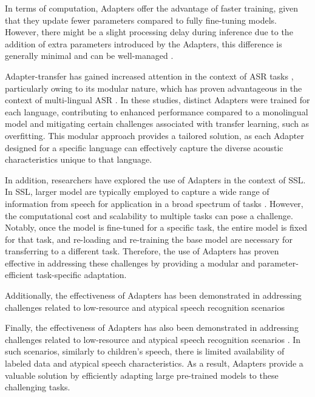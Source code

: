 In terms of computation, Adapters offer the advantage of faster training, given that they update fewer parameters compared to fully fine-tuning models. However, there might be a slight processing delay during inference due to the addition of extra parameters introduced by the Adapters, this difference is generally minimal and can be well-managed \cite{ruckle2020adapterdrop}.

Adapter-transfer has gained increased attention in the context of ASR tasks \cite{cappellazzo2023parameter,chen2023efficient,10095837}, particularly owing to its modular nature, which has proven advantageous in the context of multi-lingual ASR \cite{kannan2019large, hou2021exploiting, kulkarni2023adapting}. In these studies, distinct Adapters were trained for each language, contributing to enhanced performance compared to a monolingual model and mitigating certain challenges associated with transfer learning, such as overfitting. This modular approach provides a tailored solution, as each Adapter designed for a specific language can effectively capture the diverse acoustic characteristics unique to that language.



In addition, researchers have explored the use of Adapters in the context of SSL. In SSL, larger model are typically employed to capture a wide range of information from speech for application in a broad spectrum of tasks \cite{thomas2022efficient, fan2022draft}. However, the computational cost and scalability to multiple tasks can pose a challenge. Notably, once the model is fine-tuned for a specific task, the entire model is fixed for that task, and re-loading and re-training the base model are necessary for transferring to a different task. Therefore, the use of Adapters has proven effective in addressing these challenges by providing a modular and parameter-efficient task-specific adaptation.


Additionally, the effectiveness of Adapters has been demonstrated in addressing challenges related to low-resource and atypical speech recognition scenarios \cite{tomanek2021residual}

Finally, the effectiveness of Adapters has also been demonstrated in addressing challenges related to low-resource and atypical speech recognition scenarios \cite{tomanek2021residual}. In such scenarios, similarly to children's speech, there is limited availability of labeled data and atypical speech characteristics. As a result, Adapters provide a valuable solution by efficiently adapting large pre-trained models to these challenging tasks. 

